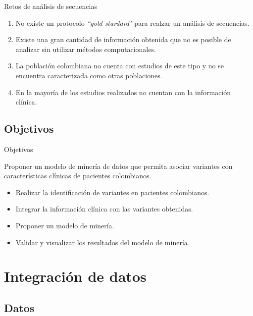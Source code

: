 \documentclass[xcolor=dvipsnames]{beamer}
\begin{document}
\begin{frame}{Retos de análisis de secuencias}

\begin{enumerate}
	\justifying
	\item No existe un protocolo \textit{``gold stardard"} para realzar un análisis de secuencias.
	
	\item Existe una gran cantidad de información obtenida que no es posible de analizar sin utilizar métodos computacionales.
	
	\item La población colombiana no cuenta con estudios de este tipo y no se encuentra caracterizada como otras poblaciones.
	
	\item En la mayoría de los estudios realizados no cuentan con la información clínica.
\end{enumerate}

   
\end{frame}

\subsection{Objetivos}

\begin{frame}{Objetivos}
	
	\begin{block}{}
		{\justifying 
			Proponer un modelo de minería de datos que permita asociar variantes con características clínicas de pacientes colombianos.
		}
	\end{block}
	
	\begin{itemize}
		\item Realizar la identificación de variantes en pacientes colombianos.
		\item Integrar la información clínica con las variantes obtenidas.
		\item Proponer un modelo de minería.
		\item Validar y visualizar los resultados del modelo de minería
	\end{itemize}
		
\end{frame}

\section{Integración de datos}
\subsection{Datos}
\end{document}
